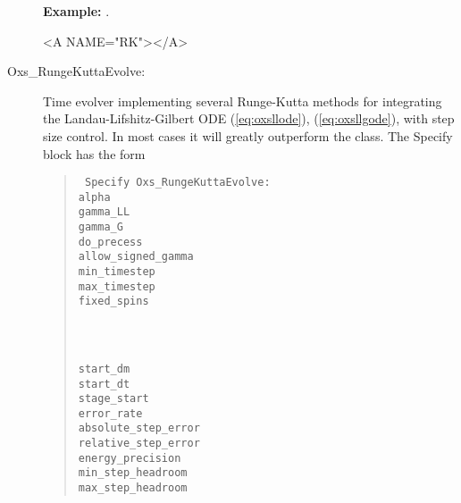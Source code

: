 \begin{description}
\textbf{Example:} .

\begin{rawhtml}<A NAME="RK"></A>\end{rawhtml}%
%
\item[Oxs\_RungeKuttaEvolve:\label{html:RungeKuttaEvolve}]
Time evolver implementing several Runge-Kutta methods for integrating
the Landau-Lifshitz-Gilbert ODE
(\ref{eq:oxsllode}), (\ref{eq:oxsllgode}), with step size control.  In
most cases it will greatly outperform the  class.
The Specify block has the form
   \begin{latexonly}
   \begin{quote}\tt
   Specify Oxs\_RungeKuttaEvolve: \ocb\\
    \bi alpha                  \oxsval{$\alpha$}\\
    \bi gamma\_LL              \oxsval{$\bar{\gamma}$}\\
    \bi gamma\_G               \oxsval{$\gamma$}\\
    \bi do\_precess            \\
    \bi allow\_signed\_gamma \\
    \bi min\_timestep          \\
    \bi max\_timestep          \\
    \bi fixed\_spins \ocb\\
    \bi\bi {}\\
    \bi\bi  {}\\
    \bi\ccb\\
    \bi start\_dm              \oxsval{$\Delta \vm$}\\
    \bi start\_dt              \\
    \bi stage\_start           \\
    \bi error\_rate            \\
    \bi absolute\_step\_error  \\
    \bi relative\_step\_error  \\
    \bi energy\_precision      \\
    \bi min\_step\_headroom    \\
    \bi max\_step\_headroom    \\

\end{quote}
\end{latexonly}
\end{description}
